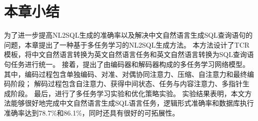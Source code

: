 \section{本章小结}

为了进一步提高NL2SQL生成的准确率以及解决中文自然语言生成SQL查询语句的问题，本章提出了一种基于多任务学习的NL2SQL生成方法。
本方法设计了TCR模板，将中文自然语言转换为英文自然语言任务和英文自然语言转换为SQL查询语句任务进行统一。
接着，提出了由编码器和解码器构成的多任务学习网络模型。
其中，编码过程包含单独编码、对准、对偶协同注意力、压缩、自注意力和最终编码阶段；
解码过程包含自注意力、获得中间状态、任务与内容注意力、多指针生成阶段。
最后，进行了多任务学习实验和优化策略实验。
实验结果表明，本文方法能够很好地完成中文自然语言生成SQL语言任务，逻辑形式准确率和数据库执行准确率达到78.7\%和86.1\%，同时还具有很好的可拓展性。
